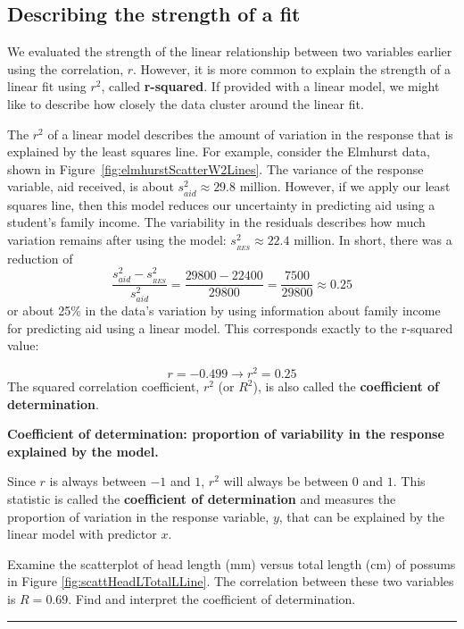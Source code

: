 \documentclass[
  10pt,
  openany]{book}
\theoremstyle{definition}
\theoremstyle{definition}
\theoremstyle{definition}
\theoremstyle{definition}
\theoremstyle{remark}
\begin{document}
\subsection{Describing the strength of a fit}\label{describing-the-strength-of-a-fit}

We evaluated the strength of the linear relationship between two variables earlier using the correlation, \(r\). However, it is more common to explain the strength of a linear fit using \(r^2\), called \textbf{r-squared}.
If provided with a linear model, we might like to describe how closely the data cluster around the linear fit.

The \(r^2\) of a linear model describes the amount of variation in the response that is explained by the least squares line.
For example, consider the Elmhurst data, shown in Figure~\ref{fig:elmhurstScatterW2Lines}.
The variance of the response variable, aid received, is about \(s_{aid}^2 \approx 29.8\) million.
However, if we apply our least squares line, then this model reduces our uncertainty in predicting aid using a student's family income.
The variability in the residuals describes how much variation remains after using the model: \(s_{_{RES}}^2 \approx 22.4\) million.
In short, there was a reduction of
\[\frac{s_{aid}^2 - s_{_{RES}}^2}{s_{aid}^2}
  = \frac{29800 - 22400}{29800}
  = \frac{7500}{29800}
  \approx 0.25\]
or about 25\% in the data's variation by using information about family income for predicting aid using a linear model.
This corresponds exactly to the r-squared value:

\[r = -0.499 \rightarrow r^2 = 0.25\]
The squared correlation coefficient, \(r^2\) (or \(R^2\)), is also called the \textbf{coefficient of determination}.

\textbf{Coefficient of determination: proportion of variability in the response explained by the model.}

Since \(r\) is always between \(-1\) and \(1\), \(r^2\) will always be between \(0\) and \(1\). This statistic is called the \textbf{coefficient of determination} and measures the proportion of variation in the response variable, \(y\), that can be explained by the linear model with predictor \(x\).

Examine the scatterplot of head length (mm) versus total length (cm) of possums in Figure \ref{fig:scattHeadLTotalLLine}.
The correlation between these two variables is \(R = 0.69\).
Find and interpret the coefficient of determination.

\begin{center}\rule{0.5\linewidth}{0.5pt}\end{center}
\end{document}
